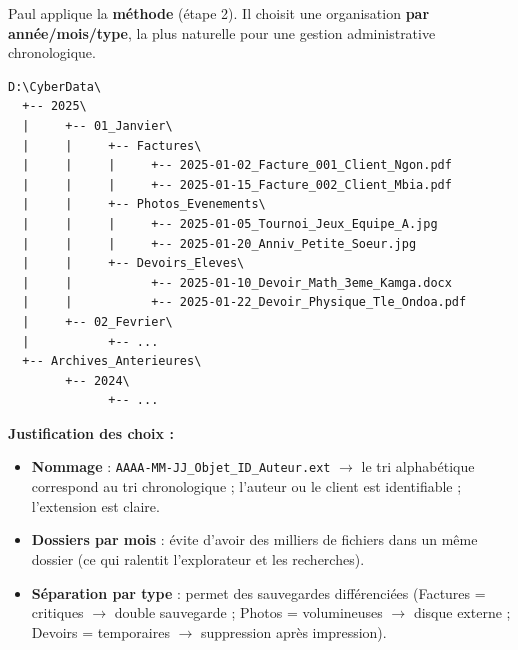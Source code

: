 \documentclass[11pt]{article}
\begin{document}
\begin{exemplebox}
Paul applique la \textbf{méthode} (étape 2). Il choisit une organisation \textbf{par année/mois/type}, la plus naturelle pour une gestion administrative chronologique.

\begin{lstlisting}
D:\CyberData\
  +-- 2025\
  |     +-- 01_Janvier\
  |     |     +-- Factures\
  |     |     |     +-- 2025-01-02_Facture_001_Client_Ngon.pdf
  |     |     |     +-- 2025-01-15_Facture_002_Client_Mbia.pdf
  |     |     +-- Photos_Evenements\
  |     |     |     +-- 2025-01-05_Tournoi_Jeux_Equipe_A.jpg
  |     |     |     +-- 2025-01-20_Anniv_Petite_Soeur.jpg
  |     |     +-- Devoirs_Eleves\
  |     |           +-- 2025-01-10_Devoir_Math_3eme_Kamga.docx
  |     |           +-- 2025-01-22_Devoir_Physique_Tle_Ondoa.pdf
  |     +-- 02_Fevrier\
  |           +-- ...
  +-- Archives_Anterieures\
        +-- 2024\
              +-- ...
\end{lstlisting}

\textbf{Justification des choix :}
\begin{itemize}
    \item \textbf{Nommage} : \texttt{AAAA-MM-JJ\_Objet\_ID\_Auteur.ext} $\to$ le tri alphabétique correspond au tri chronologique ; l'auteur ou le client est identifiable ; l'extension est claire.
    \item \textbf{Dossiers par mois} : évite d'avoir des milliers de fichiers dans un même dossier (ce qui ralentit l'explorateur et les recherches).
    \item \textbf{Séparation par type} : permet des sauvegardes différenciées (Factures = critiques $\to$ double sauvegarde ; Photos = volumineuses $\to$ disque externe ; Devoirs = temporaires $\to$ suppression après impression).
\end{itemize}
\end{exemplebox}
\end{document}
